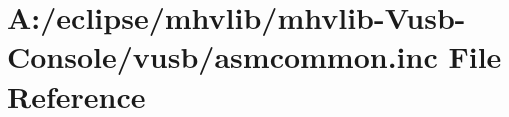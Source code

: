 \hypertarget{mhvlib-_vusb-_console_2vusb_2asmcommon_8inc}{\section{A\-:/eclipse/mhvlib/mhvlib-\/\-Vusb-\/\-Console/vusb/asmcommon.inc File Reference}
\label{mhvlib-_vusb-_console_2vusb_2asmcommon_8inc}
}
